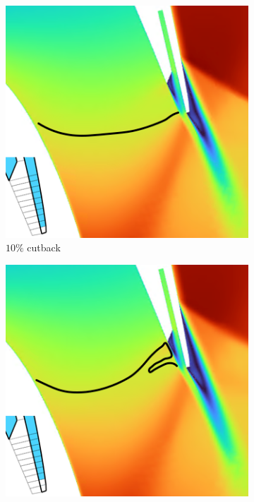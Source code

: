 \documentclass[a4paper, 11pt, oneside]{report}
\begin{document}
\begin{figure}[H]
\begin{subfigure}{.42\textwidth}
		\includegraphics[width=\linewidth]{figs/ss_cutbacks_m1_lines_1.png}
		\caption{$10\%$ cutback}
		\vspace{0.018\textheight}
	\end{subfigure}
	\begin{subfigure}{.42\textwidth}
		\centering
		\includegraphics[width=\linewidth]{figs/ss_cutbacks_m1_lines_2.png}

\end{subfigure}
\end{figure}
\end{document}
